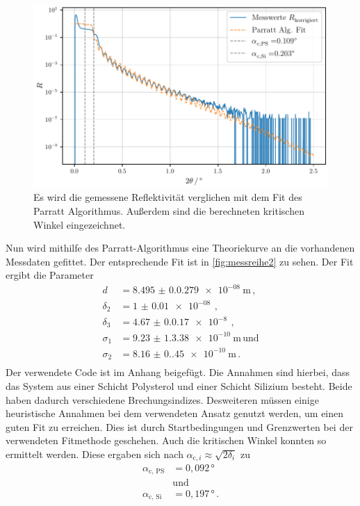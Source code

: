 \begin{figure}
    \centering
    \includegraphics[width = 0.8 \linewidth]{build/messung2.pdf}
    \caption{Es wird die gemessene Reflektivität verglichen mit dem Fit des Parratt Algorithmus.
    Außerdem sind die berechneten kritischen Winkel eingezeichnet.}
    \label{fig:messreihe2}
\end{figure}

Nun wird mithilfe des Parratt-Algorithmus eine Theoriekurve an die vorhandenen Messdaten gefittet.
Der entsprechende Fit ist in \autoref{fig:messreihe2} zu sehen.
Der Fit ergibt die Parameter
\begin{align*}
    d & = \qty{8.495(0.0279)e-08}{\unit\meter} \, , \\
    \delta_2 & = \qty{1(0.01)e-08}{} \, , \\
    \delta_3 & = \qty{4.67(0.017)e-8}{} \, , \\
    \sigma_1 & = \qty{9.23(1.338)e-10}{\unit\meter} \, \text{und} \\
    \sigma_2 & = \qty{8.16(0.45)e-10}{\unit\meter} \, . \\
\end{align*}
Der verwendete Code ist im Anhang beigefügt.
Die Annahmen sind hierbei, dass das System aus einer Schicht Polysterol und einer Schicht Silizium besteht.
Beide haben dadurch verschiedene Brechungsindizes.
Desweiteren müssen einige heuristische Annahmen bei dem verwendeten Ansatz genutzt werden, um einen guten Fit zu erreichen.
Dies ist durch Startbedingungen und Grenzwerten bei der verwendeten Fitmethode geschehen.
Auch die kritischen Winkel konnten so ermittelt werden.
Diese ergaben sich nach $\alpha_{\text{c}, i} \approx \sqrt{2 \delta_i}$ zu
\begin{align*}
    \alpha_{\text{c, PS}} &= 0{,}092 \, ° \\
    &\text{und} \\
    \alpha_{\text{c, Si}} &= 0{,}197 \, ° \, .
\end{align*}
